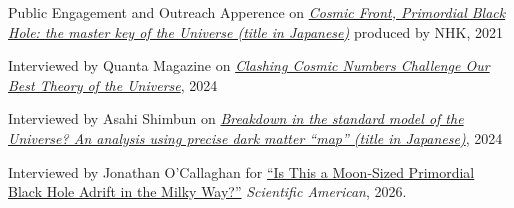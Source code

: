 \begin{rSection}{Public Engagement and Outreach}
  Apperence on \href{https://www.nhk-ondemand.jp/goods/G2021114366SA000/}{\textit{Cosmic Front, Primordial Black Hole: the master key of the Universe (title in Japanese)}} produced by NHK, 2021

  Interviewed by Quanta Magazine on \href{https://www.quantamagazine.org/clashing-cosmic-numbers-challenge-our-best-theory-of-the-universe-20240119/}{\textit{Clashing Cosmic Numbers Challenge Our Best Theory of the Universe}}, 2024
  
  Interviewed by Asahi Shimbun on \href{https://www.asahi.com/articles/ASR4H415RR48ULBH001.html}{\textit{Breakdown in the standard model of the Universe? An analysis using precise dark matter ``map'' (title in Japanese)}}, 2024


  Interviewed by Jonathan O'Callaghan for \href{https://www.scientificamerican.com/article/did-we-just-see-a-primordial-black-hole-at-the-milky-ways-edge/}{``Is This a Moon-Sized Primordial Black Hole Adrift in the Milky Way?''} \textit{Scientific American}, 2026.
\end{rSection}
